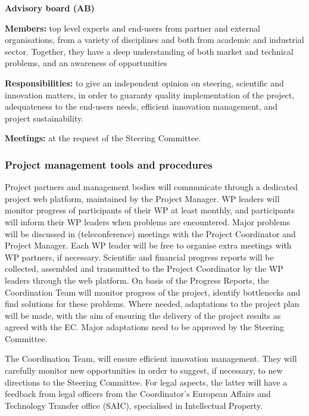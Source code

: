 \begin{description}
\item{\textbf{Advisory board (AB)}} \nobreak\par

  \textbf{Members:} top level experts and end-users from partner and
  external organisations, from a variety of disciplines and both from
  academic and industrial sector. Together, they have a deep
  understanding of both market and technical problems, and an
  awareness of opportunities

  \textbf{Responsibilities:} to give an independent opinion on
  steering, scientific and innovation matters, in order to guaranty
  quality implementation of the project, adequateness to the end-users
  needs, efficient innovation management, and project sustainability.


  \textbf{Meetings:} at the request of the Steering Committee.
\end{description}

\subsubsection{Project management tools and procedures}

Project partners and management bodies will communicate through
a dedicated project web platform, maintained by the Project
Manager. WP leaders will monitor progress of
participants of their WP at least monthly, and participants will inform their WP
leaders when problems are encountered. Major problems will be
discussed in (teleconference) meetings with the Project Coordinator
and Project Manager. Each WP leader will be free to organise
extra meetings with WP partners, if necessary. Scientific and
financial progress reports will be collected, assembled and
transmitted to the Project Coordinator by the WP leaders through the
web platform. On basis of the Progress Reports, the Coordination Team
will monitor progress of the project, identify bottlenecks and find
solutions for these problems. Where needed, adaptations to the project
plan will be made, with the aim of ensuring the delivery of the project
results as agreed with the EC. Major adaptations need to be approved
by the Steering Committee.

The Coordination Team, will ensure efficient innovation management.
They will carefully monitor new opportunities in order to suggest, if
necessary, to new directions to the Steering Committee. For legal
aspects, the latter will have a feedback from legal officers from the
Coordinator’s European Affairs and Technology Transfer office (SAIC),
specialised in Intellectual Property.

